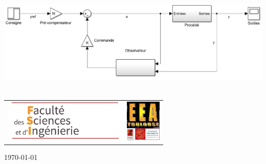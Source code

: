 \begin{titlepage}
\begin{center}
\vspace{2cm}
\includegraphics[width=.8\textwidth]{./page_de_garde/schemaRE.png}~\\[1cm]

\vfill
\begin{tabular}{cc}
   \includegraphics[height=2cm]{./page_de_garde/logo_fsi.png} \hspace{2cm} &
    \hspace{2cm}
   \includegraphics[height=2cm]{./page_de_garde/logo_eea.jpg} \\
\end{tabular}

{\large \today}

\end{center}
\end{titlepage}
